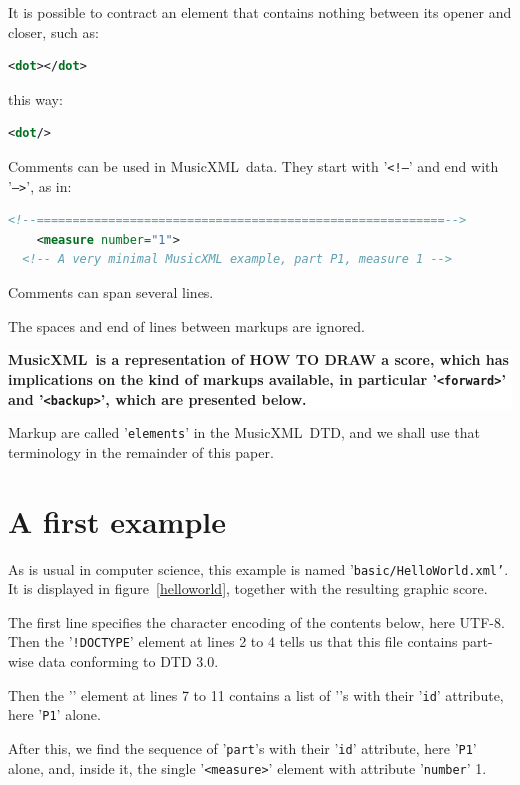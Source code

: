 \documentclass[12pt,a4paper]{article}
\newcommand{\mxml}{MusicXML}
\newcommand{\hand}[1]{
  \makebox[0pt][r]{
  	\textcolor{bordeaux}{\raisebox{-.5ex}{\pnt\symbol{'345}}}\hspace{1em}
	}%
	\hfill%
	{%
	  \setlength{\fboxsep}{2ex}%
	  \colorbox{white}{
	  	\parbox{.8\textwidth}{\textcolor{bordeaux}{\textbf{#1}}}
	  }
		\hfill
	}
}
\begin{document}
It is possible to contract an element that contains nothing between its opener and closer, such as:
\begin{lstlisting}[language=XML]
        <dot></dot>
\end{lstlisting}
this way:
\begin{lstlisting}[language=XML]
        <dot/>
\end{lstlisting}

Comments can be used in \mxml\ data. They start with {'\tt <!--}' and end with {'\tt -->}', as in:
\begin{lstlisting}[language=XML]
<!--=========================================================-->
    <measure number="1">
  <!-- A very minimal MusicXML example, part P1, measure 1 -->
\end{lstlisting}

Comments can span several lines.

The spaces and end of lines between markups are ignored.

\hand {\mxml\ is a representation of HOW TO DRAW a score, which has implications on the kind of markups available, in particular {'\tt <forward>}' and {'\tt <backup>}', which are presented below.
}

Markup are called {'\tt elements}' in the \mxml\ DTD, and we shall use that terminology in the remainder of this paper.

\section{A first example}

As is usual in computer science, this example is named '{\tt basic/HelloWorld.xml'}. It is displayed in figure~\ref{helloworld}, together with the resulting graphic score.

The first line specifies the character encoding of the contents below, here UTF-8. Then the '{\tt !DOCTYPE}' element at lines 2 to 4 tells us that this file contains part-wise data conforming to DTD 3.0.

Then the '{\tt <part-list>}' element at lines 7 to 11 contains a list of '{\tt <score-part>}'s with their '{\tt id}' attribute, here '{\tt P1}' alone.

After this, we find the sequence of '{\tt part}'s with their '{\tt id}' attribute, here '{\tt P1}' alone, and, inside it, the single '{\tt <measure>}' element with attribute '{\tt number}' 1.
\end{document}
